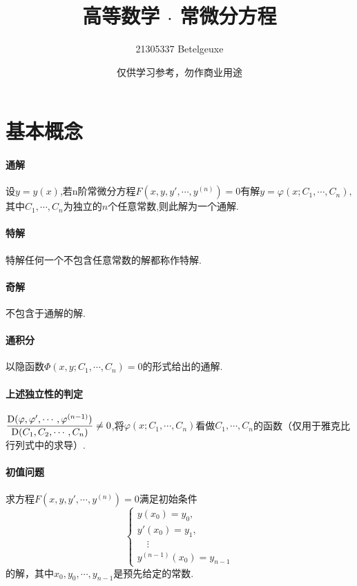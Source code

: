 \documentclass[UTF8]{ctexart}
\title{\zihao{1}高等数学 $\cdot$ 常微分方程}
\author{21305337 Betelgeuxe}
\date{仅供学习参考，勿作商业用途}
\begin{document}
\maketitle
\tableofcontents

\section{基本概念}

\paragraph*{通解}设$y=y(x)$,若n阶常微分方程$F(x,y,y',\cdots,y^{(n)})=0$有解$y=\varphi(x;C_1,\cdots,C_n),$其中$C_1,\cdots,C_n$为独立的$n$个任意常数,则此解为一个通解.

\paragraph*{特解}特解任何一个不包含任意常数的解都称作特解.

\paragraph*{奇解}不包含于通解的解.

\paragraph*{通积分}以隐函数$\varPhi(x,y;C_1,\cdots,C_n)=0$的形式给出的通解.

\paragraph*{上述独立性的判定}
$\displaystyle\frac
{{\rm D}(\varphi,\varphi',\cdots,\varphi^{(n-1)})}
{{\rm D}(C_1,C_2,\cdots,C_n)}
\neq0$,将$\varphi(x;C_1,\cdots,C_n)$看做$C_1,\cdots,C_n$的函数（仅用于雅克比行列式中的求导）.

\paragraph*{初值问题}
求方程$F(x,y,y',\cdots,y^{(n)})=0$满足初始条件
$$\begin{cases}
y(x_0)=y_0,\\
y'(x_0)=y_1,\\
\quad \vdots\\
y^{(n-1)}(x_0)=y_{n-1}
\end{cases}$$
的解，其中$x_0,y_0,\cdots,y_{n-1}$是预先给定的常数.
\end{document}
